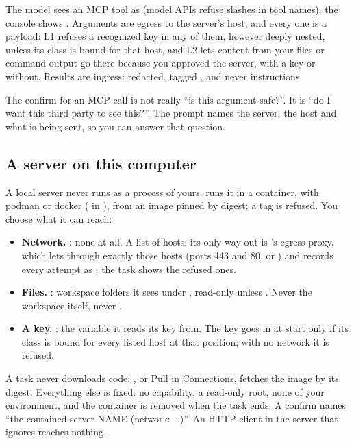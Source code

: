 The model sees an MCP tool as  (model APIs refuse
slashes in tool names); the console shows . Arguments are
egress to the server's host, and every one is a payload: L1 refuses a
recognized key in any of them, however deeply nested, unless its class is
bound for that host, and L2 lets content from your files or command output
go there because you approved the server, with a key or without. Results
are ingress: redacted, tagged , and never instructions.

\begin{tip}
The confirm for an MCP call is not really ``is this argument safe?''. It
is ``do I want this third party to see this?''. The prompt names the
server, the host and what is being sent, so you can answer that question.
\end{tip}

\subsection*{A server on this computer}

A local server never runs as a process of yours. \nodwyn{} runs it in a
container, with podman or docker ( in
), from an image pinned by digest; a tag is refused. You
choose what it can reach:

\begin{itemize}
  \item \textbf{Network.} : none at all. A list of hosts:
    its only way out is \nodwyn{}'s egress proxy, which lets through
    exactly those hosts (ports 443 and 80, or ) and records
    every attempt as ; the task shows the refused ones.
  \item \textbf{Files.} : workspace folders it sees under
    , read-only unless . Never the workspace
    itself, never .
  \item \textbf{A key.} : the variable it
    reads its key from. The key goes in at start only if its class is bound
    for every listed host at that position; with no network it is refused.
\end{itemize}

A task never downloads code: , or Pull in
Connections, fetches the image by its digest. Everything else is fixed: no
capability, a read-only root, none of your environment, and the container
is removed when the task ends. A confirm names ``the contained server NAME
(network: \ldots)''. An HTTP client in the server that ignores
 reaches nothing.

